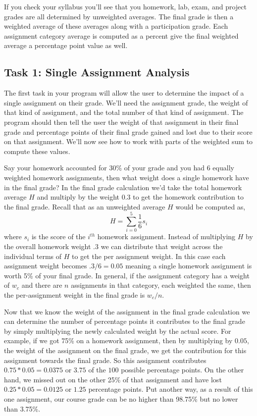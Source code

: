 \documentclass[]{tufte-handout}
\begin{document}
If you check your syllabus you'll see that you homework, lab, exam, and project grades are all determined by unweighted averages. The final grade is then a weighted average of these averages along with a participation grade. Each assignment category average is computed as a percent give the final weighted average a percentage point value as well.

\subsection{Task 1: Single Assignment Analysis}

The first task in your program will allow the user to determine the impact of a single assignment on their grade. We'll need the assignment grade, the weight of that kind of assignment, and the total number of that kind of assignment. The program should then tell the user the weight of that assignment in their final grade and percentage points of their final grade gained and lost due to their score on that assignment. We'll now see how to work with parts of the weighted sum to compute these values.

Say your homework accounted for 30\% of your grade and you had 6 equally weighted homework assignments, then what weight does a single homework have in the final grade? In the final grade calculation we'd take the total homework average $H$ and multiply by the weight $0.3$ to get the homework contribution to the final grade. Recall that as an unweighted average $H$ would be computed as,
\[
  H = \sum\limits_{i=0}^{5} \dfrac{1}{6} s_i
\]
where $s_i$ is the score of the $i^{th}$ homework assignment. Instead of multiplying $H$ by the overall homework weight $.3$ we can distribute that weight across the individual terms of $H$ to get the per assignment weight. In this case each assignment weight becomes $.3/6 = 0.05$ meaning a single homework assignment is worth 5\% of your final grade.  In general, if the assignment category has a weight of $w_c$ and there are $n$ assignments in that category, each weighted the same, then the per-assignment weight in the final grade is $w_c/n$.

Now that we know the weight of the assignment in the final grade calculation we can determine the number of percentage points it contributes to the final grade by simply multiplying the newly calculated weight by the actual score. For example, if we got 75\% on a homework assignment, then by multiplying by $0.05$, the weight of the assignment on the final grade, we get the contribution for this assignment towards the final grade. So this assignment contributes $0.75*0.05 = 0.0375$ or $3.75$ of the $100$ possible percentage points. On the other hand, we missed out on the other 25\% of that assignment and have lost $0.25*0.05=0.0125$ or $1.25$ percentage points. Put another way, as a result of this one assignment, our course grade can be no higher than 98.75\% but no lower than 3.75\%.
\end{document}
